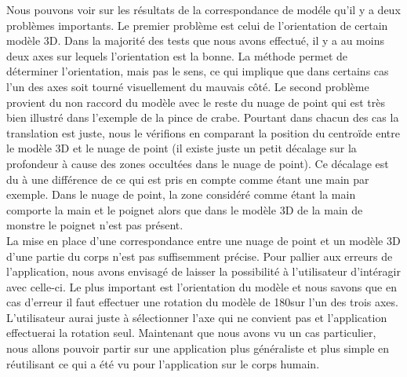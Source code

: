 Nous pouvons voir sur les résultats de la correspondance de modéle qu'il y a deux problèmes importants. Le premier problème est celui de l'orientation
de certain modèle 3D. Dans la majorité des tests que nous avons effectué, il y a au moins deux axes sur lequels l'orientation est la bonne. La méthode 
permet de déterminer l'orientation, mais pas le sens, ce qui implique que dans certains cas l'un des axes soit tourné visuellement du mauvais côté.
Le second problème provient du non raccord du modèle avec le reste du nuage de point qui est très bien illustré dans l'exemple de la pince de crabe.
Pourtant dans chacun des cas la translation est juste, nous le vérifions en comparant la position du centroïde entre le modèle 3D et le nuage de point
(il existe juste un petit décalage sur la profondeur à cause des zones occultées dans le nuage de point). Ce décalage est du à une différence de ce qui est 
pris en compte comme étant une main par exemple. Dans le nuage de point, la zone considéré comme étant la main comporte la main et le poignet alors que 
dans le modèle 3D de la main de monstre le poignet n'est pas présent.\\

La mise en place d'une correspondance entre une nuage de point et un modèle 3D d'une partie du corps n'est pas suffisemment précise. Pour pallier
aux erreurs de l'application, nous avons envisagé de laisser la possibilité à l'utilisateur d'intéragir avec celle-ci. Le plus important est l'orientation
du modèle et nous savons que en cas d'erreur il faut effectuer une rotation du modèle de 180\degre sur l'un des trois axes. L'utilisateur aurai juste à 
sélectionner l'axe qui ne convient pas et l'application effectuerai la rotation seul. Maintenant que nous avons vu un cas particulier, nous allons pouvoir
partir sur une application plus généraliste et plus simple en réutilisant ce qui a été vu pour l'application sur le corps humain.  
